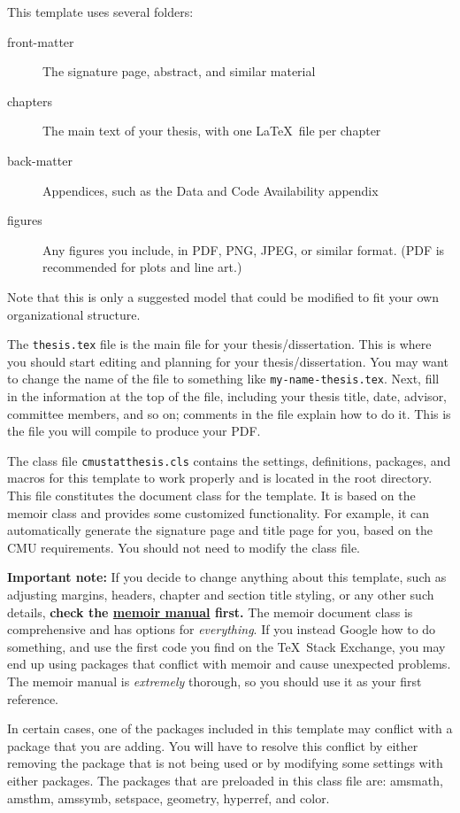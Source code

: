This template uses several folders:
\begin{description}
\item[front-matter] The signature page, abstract, and similar material
\item[chapters] The main text of your thesis, with one \LaTeX\ file per chapter
\item[back-matter] Appendices, such as the Data and Code Availability appendix
\item[figures] Any figures you include, in PDF, PNG, JPEG, or similar format.
  (PDF is recommended for plots and line art.)
\end{description}

Note that this is only a suggested model that could be modified to fit your own
organizational structure.

The \texttt{thesis.tex} file is the main file for your thesis/dissertation. This
is where you should start editing and planning for your thesis/dissertation. You
may want to change the name of the file to something like
\texttt{my-name-thesis.tex}. Next, fill in the information at the top of the
file, including your thesis title, date, advisor, committee members, and so on;
comments in the file explain how to do it. This is the file you will compile to
produce your PDF.

The class file \texttt{cmustatthesis.cls} contains the settings, definitions,
packages, and macros for this template to work properly and is located in the
root directory. This file constitutes the document class for the template. It is
based on the memoir class and provides some customized functionality. For
example, it can automatically generate the signature page and title page for
you, based on the CMU requirements. You should not need to modify the class
file.

\textbf{Important note:} If you decide to change anything about this template,
such as adjusting margins, headers, chapter and section title styling, or any
other such details, \textbf{check the
  \href{http://mirrors.ctan.org/macros/latex/contrib/memoir/memman.pdf}{memoir
    manual} first.} The memoir document class is comprehensive and has options
for \emph{everything}. If you instead Google how to do something, and use the
first code you find on the \TeX\ Stack Exchange, you may end up using packages
that conflict with memoir and cause unexpected problems. The memoir manual is
\emph{extremely} thorough, so you should use it as your first reference.

In certain cases, one of the packages included in this template may conflict
with a package that you are adding. You will have to resolve this conflict by
either removing the package that is not being used or by modifying some settings
with either packages. The packages that are preloaded in this class file are:
amsmath, amsthm, amssymb, setspace, geometry, hyperref, and color.


